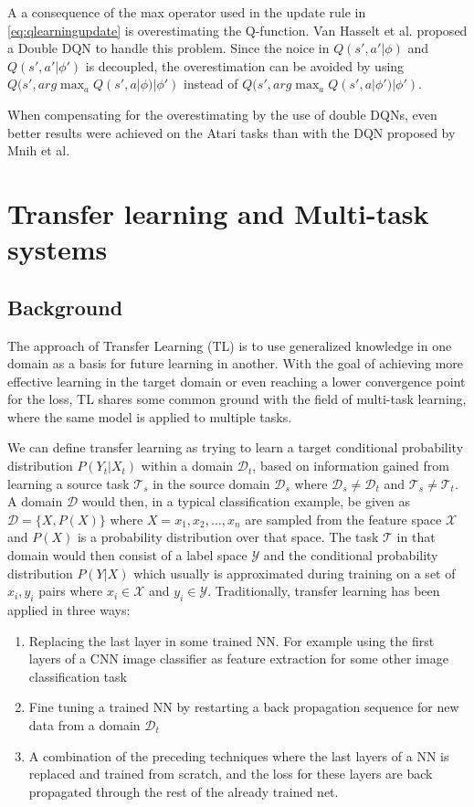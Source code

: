\documentclass[a4paper,english]{report}
\begin{document}
A a consequence of the max operator used in the update rule in \ref{eq:qlearningupdate} is overestimating the Q-function. Van Hasselt et al. \cite{doubledqn} proposed a Double DQN to handle this problem. Since the noice in \(Q(s',a'|\phi)\) and \(Q(s',a'|\phi')\) is decoupled, the overestimation can be avoided by using \(Q(s', arg\max_a Q(s', a|\phi)|\phi')\) instead of \(Q(s', arg\max_a Q(s', a|\phi')|\phi')\).

When compensating for the overestimating by the use of double DQNs, even better results were achieved on the Atari tasks than with the DQN proposed by Mnih et al.


\chapter{Transfer learning and Multi-task systems}
\section{Background}\label{tfbackground}
The approach of Transfer Learning (TL) is to use generalized knowledge in one domain as a basis for future learning in another. With the goal of achieving more effective learning in the target domain or even reaching a lower convergence point for the loss, TL shares some common ground with the field of multi-task learning, where the same model is applied to multiple tasks. 

We can define transfer learning as trying to learn a target conditional probability distribution \(P(Y_t|X_t)\) within a domain \(\mathcal{D}_t\), based on information gained from learning a source task \(\mathcal{T}_s\) in the source domain \(\mathcal{D}_s\) where \(\mathcal{D}_s \neq \mathcal{D}_t\) and \(\mathcal{T}_s \neq \mathcal{T}_t\). A domain \(\mathcal{D}\) would then, in a typical classification example, be given as \(\mathcal{D} = \{X, P(X)\}\) where \(X = x_1,x_2, \dotsc ,x_n\) are sampled from the feature space \(\mathcal{X}\) and \(P(X)\) is a probability distribution over that space. The task \(\mathcal{T}\) in that domain would then consist of a label space \(\mathcal{Y}\) and the conditional probability distribution \(P(Y|X)\) which usually is approximated during training on a set of \(x_i, y_i\) pairs where \(x_i \in \mathcal{X}\) and \(y_i \in \mathcal{Y}\).
\newline\newline
Traditionally, transfer learning has been applied in three ways: 
\begin{enumerate}  
\item Replacing the last layer in some trained NN. For example using the first layers of a CNN image classifier as feature extraction for some other image classification task 
\item Fine tuning a trained NN by restarting a back propagation sequence for new data from a domain \(\mathcal{D}_t\)
\item A combination of the preceding techniques where the last layers of a NN is replaced and trained from scratch, and the loss for these layers are back propagated through the rest of the already trained net.
\end{enumerate}
\end{document}
